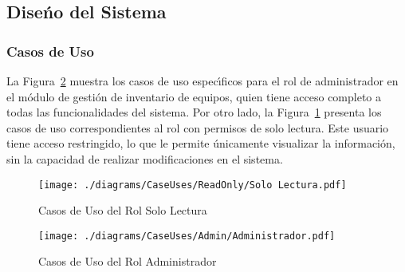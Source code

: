 \documentclass[stu, 12pt, letterpaper, donotrepeattitle, floatsintext, natbib]{apa7}
\begin{document}
\subsection{Dise\'{n}o del Sistema}
\subsubsection{Casos de Uso}
La Figura~\ref{admin} muestra los casos de uso espec\'{\i}ficos para el rol de administrador en el m\'odulo de gesti\'on de inventario de equipos, quien tiene acceso completo a todas las funcionalidades del sistema. Por otro lado,
la Figura~\ref{readonly} presenta los casos de uso correspondientes al rol con permisos de solo lectura. Este usuario tiene acceso restringido, lo que le permite \'unicamente visualizar la informaci\'on, sin la capacidad de realizar modificaciones en el sistema.
\begin{figure}[H]
    \centering
    \caption{Casos de Uso del Rol Solo Lectura}\label{readonly}
    \texttt{[image: ./diagrams/CaseUses/ReadOnly/Solo Lectura.pdf]}
\end{figure}
\begin{figure}[H]
    \centering
    \caption{Casos de Uso del Rol Administrador}\label{admin}
    \texttt{[image: ./diagrams/CaseUses/Admin/Administrador.pdf]}
\end{figure}
\end{document}
